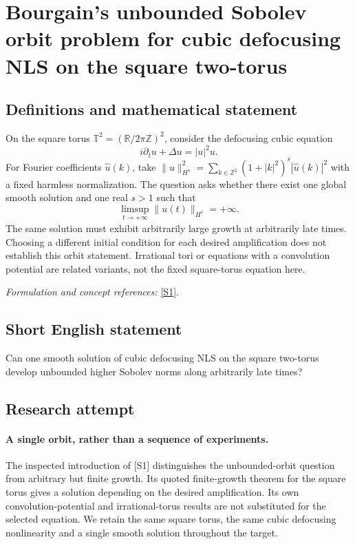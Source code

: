 \documentclass[11pt]{article}
\begin{document}
\section*{\texorpdfstring{Bourgain's unbounded Sobolev orbit problem for cubic defocusing NLS on the square two-torus}{Bourgain's unbounded Sobolev orbit problem for cubic defocusing NLS on the square two-torus}}\label{30006898}
\subsection{Definitions and mathematical statement}
On the square torus $\mathbb T^2=({\mathbb{R}}/2\pi{\mathbb{Z}})^2$, consider the defocusing cubic equation
\[
 i\partial_tu+\Delta u=|u|^2u.
\]
For Fourier coefficients $\widehat u(k)$, take $\|u\|_{H^s}^2=\sum_{k\in{\mathbb{Z}}^2}(1+|k|^2)^s|\widehat u(k)|^2$ with a fixed harmless normalization. The question asks whether there exist one global smooth solution and one real $s>1$ such that
\[
 \limsup_{t\to+\infty}\|u(t)\|_{H^s}=+\infty.
\]
The same solution must exhibit arbitrarily large growth at arbitrarily late times. Choosing a different initial condition for each desired amplification does not establish this orbit statement. Irrational tori or equations with a convolution potential are related variants, not the fixed square-torus equation here.
\par\smallskip\textit{Formulation and concept references:} \href{https://arxiv.org/html/2308.13468}{[S1]}.

\subsection{Short English statement}
Can one smooth solution of cubic defocusing NLS on the square two-torus develop unbounded higher Sobolev norms along arbitrarily late times?
\subsection{Research attempt}
\paragraph{A single orbit, rather than a sequence of experiments.}
The inspected introduction of [S1] distinguishes the unbounded-orbit
question from arbitrary but finite growth. Its quoted finite-growth
theorem for the square torus gives a solution depending on the desired
amplification. Its own convolution-potential and irrational-torus
results are not substituted for the selected equation. We retain the
same square torus, the same cubic defocusing nonlinearity and a single
smooth solution throughout the target.
\end{document}
